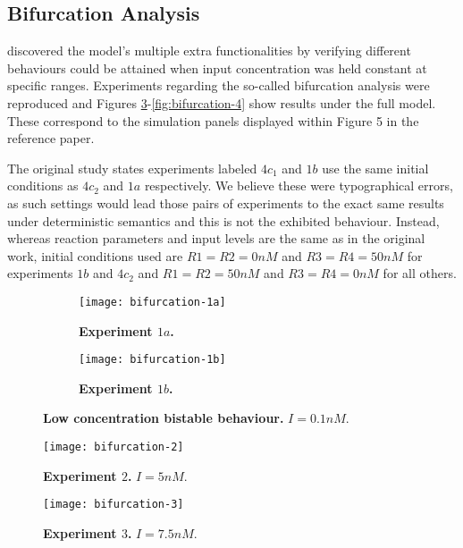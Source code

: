   \subsection{Bifurcation Analysis}

    \citet{multif} discovered the model's multiple extra functionalities by verifying different behaviours could be attained when input concentration was held constant at specific ranges.
    Experiments regarding the so-called bifurcation analysis were reproduced and Figures \ref{fig:bifurcation-1}-\ref{fig:bifurcation-4} show results under the full model.
    These correspond to the simulation panels displayed within Figure 5 in the reference paper.

    The original study states experiments labeled $4c_{1}$ and $1b$ use the same initial conditions as $4c_{2}$ and $1a$ respectively.
    We believe these were typographical errors, as such settings would lead those pairs of experiments to the exact same results under deterministic semantics and this is not the exhibited behaviour.
    Instead, whereas reaction parameters and input levels are the same as in the original work, initial conditions used are $R1=R2=0nM$ and $R3=R4=50nM$ for experiments $1b$ and $4c_{2}$ and $R1=R2=50nM$ and $R3=R4=0nM$ for all others.

    \begin{figure}[!htb]
      \centering
      \begin{subfigure}[t]{0.45\textwidth}
        \centering
        \texttt{[image: bifurcation-1a]}
        \caption{\textbf{Experiment $1a$.}}
        \label{fig:bifurcation-1a}
      \end{subfigure}
      \hfill
      \begin{subfigure}[t]{0.45\textwidth}
        \centering
        \texttt{[image: bifurcation-1b]}
        \caption{\textbf{Experiment $1b$.}}
        \label{fig:bifurcation-1b}
      \end{subfigure}
      \caption{\textbf{Low concentration bistable behaviour.} $I = 0.1 nM$.}
      \label{fig:bifurcation-1}
    \end{figure}

    \begin{figure}[!htb]
      \centering
      \texttt{[image: bifurcation-2]}
      \caption{\textbf{Experiment $2$.} $I = 5 nM$.}
      \label{fig:bifurcation-2}
    \end{figure}

    \begin{figure}[!htb]
      \centering
      \texttt{[image: bifurcation-3]}
      \caption{\textbf{Experiment $3$.} $I = 7.5nM$.}
      \label{fig:bifurcation-3}
    \end{figure}

